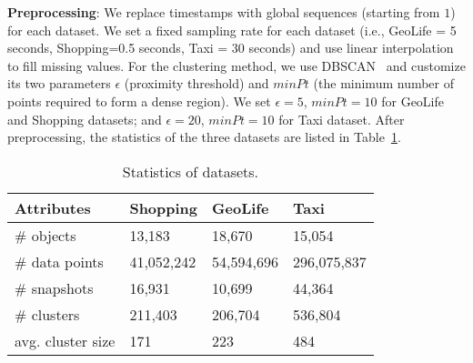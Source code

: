 \textbf{Preprocessing}: We replace timestamps with global sequences (starting from $1$) for each dataset. 
We set a fixed sampling rate for each dataset (i.e., GeoLife = 5 seconds, Shopping=0.5 seconds, Taxi = 30 seconds)
and use linear interpolation to fill missing values.
For the clustering method, we use DBSCAN~\cite{ester1996density} and customize its two parameters $\epsilon$ (proximity threshold) and $minPt$ (the minimum number of points required to form a dense region). We set $\epsilon=5$, $minPt=10$ for GeoLife and Shopping datasets; and $\epsilon=20$, $minPt=10$ for Taxi dataset. 
After preprocessing, the statistics of the three datasets are listed in Table~\ref{exp:dataset}. 

\begin{table} [h]
\center
\begin{tabular}{|l|l|l|l|}
\hline
 \textbf{Attributes}& \textbf{Shopping} &  \textbf{GeoLife} &  \textbf{Taxi} \\ 
\hline 
\# objects  & 13,183 & 18,670 & 15,054\\ 
\hline
\# data points  & 41,052,242 & 54,594,696 & 296,075,837\\ 
\hline
\# snapshots  & 16,931 & 10,699 & 44,364\\ 
\hline
\# clusters  & 211,403  & 206,704& 536,804\\
\hline
avg. cluster size  & 171 & 223 & 484\\
\hline
\end{tabular}
\caption{Statistics of datasets.}
\label{exp:dataset}
\end{table}

